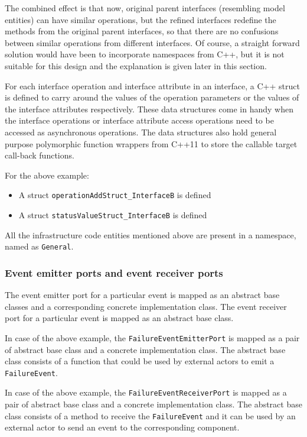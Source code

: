 The combined effect is that now, original parent interfaces (resembling model entities) can have similar operations, but the refined interfaces redefine the methods from the original parent interfaces, so that there are no confusions between similar operations from different interfaces. Of course, a straight forward solution would have been to incorporate namespaces from C++, but it is not suitable for this design and the explanation is given later in this section.

For each interface operation and interface attribute in an interface, a C++ struct is defined to carry around the values of the operation parameters or the values of the interface attributes respectively. These data structures come in handy when the interface operations or interface attribute access operations need to be accessed as asynchronous operations. The data structures also hold general purpose polymorphic function wrappers from C++11 to store the callable target call-back functions. 

For the above example:
\begin{itemize}
\item A struct \texttt{operationAdd\allowbreak Struct\_\allowbreak InterfaceB} is defined
\item A struct \texttt{statusValue\allowbreak Struct\_\allowbreak InterfaceB} is defined
\end{itemize}  

All the infrastructure code entities mentioned above are present in a namespace, named as \texttt{General}.

\subsubsection{\textbf{Event emitter ports and event receiver ports}}
The event emitter port for a particular event is mapped as an abstract base classes and a corresponding concrete implementation class. The event receiver port for a particular event is mapped as an abstract base class.  

In case of the above example, the \texttt{FailureEvent\allowbreak EmitterPort} is mapped as a pair of abstract base class and a concrete implementation class. The abstract base class consists of a function that could be used by external actors to emit a \texttt{FailureEvent}.  

In case of the above example, the \texttt{FailureEvent\allowbreak ReceiverPort} is mapped as a pair of abstract base class and a concrete implementation class. The abstract base class consists of a method to receive the \texttt{FailureEvent} and it can be used by an external actor to send an event to the corresponding component.

